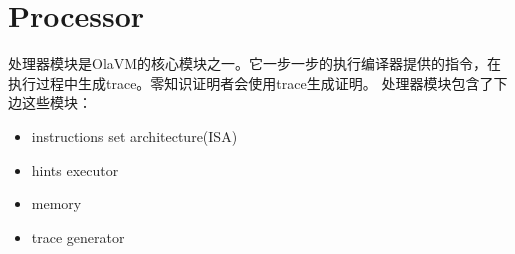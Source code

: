\section{Processor}\label{sec: processor}
处理器模块是OlaVM的核心模块之一。它一步一步的执行编译器提供的指令，在执行过程中生成trace。零知识证明者会使用trace生成证明。
处理器模块包含了下边这些模块：
\begin{itemize}
    \item instructions set architecture(ISA)
    \item hints executor
    \item memory
    \item trace generator
\end{itemize}


